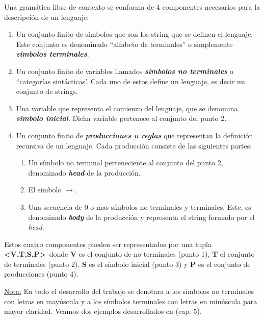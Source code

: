 \begin{definition}
Una gramática libre de contexto se conforma de 4 componentes necesarios para la descripción de un lenguaje:

\begin{enumerate}
\item Un conjunto finito de símbolos que son los string que se definen el lenguaje. Este conjunto es denominado ``alfabeto de terminales'' o simplemente \textit{\textbf{símbolos terminales}}.

\item Un conjunto finito de variables llamados \textit{\textbf{símbolos no terminales}} o ``categorías sintácticas'. Cada uno de estos define un lenguaje, es decir un conjunto de strings.

\item Una variable que representa el comienzo del lenguaje, que se denomina \textit{\textbf{símbolo inicial}}. Dicha variable pertenece al conjunto del punto 2.

\item Un conjunto finito de \textit{\textbf{producciones o reglas}} que representan la definición recursiva de un lenguaje. Cada producción consiste de las siguientes partes:

\begin{enumerate}
\item Un símbolo no terminal perteneciente al conjunto del punto 2, denominado \textit{\textbf{head}} de la producción.

\item El símbolo \textbf{$\rightarrow$}.

\item Una secuencia de 0 o mas símbolos no terminales y terminales. Este, es denominado \textit{\textbf{body}} de la producción y representa el string formado por el \textit{head}.
\end{enumerate}
\end{enumerate}

Estos cuatro componentes pueden ser representados por una tupla \textbf{<V,T,S,P>}\ donde \textbf{V} es el conjunto de no terminales (punto 1), \textbf{T} el conjunto de terminales (punto 2), \textbf{S} es el símbolo inicial (punto 3) y \textbf{P} es el conjunto de producciones (punto 4).
\end{definition}

\underline{Nota:}
En todo el desarrollo del trabajo se denotara a los símbolos no terminales con letras en mayúscula y a los símbolos terminales con letras en minúscula para mayor claridad.
Veamos dos ejemplos desarrollados en \cite{gramatica} (cap. 5).


